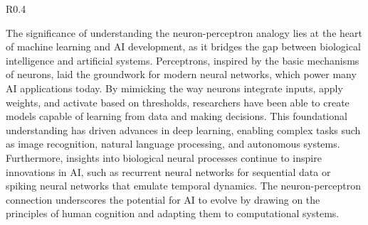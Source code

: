 \begin{wrapfigure}{R}{0.4\textwidth}
\begin{tcolorbox}[every float=\centering, drop shadow, title=The Perceptron ,colback=WMgold,colframe=WMgreen,
  colbacktitle=WMgreen,]
  \label{fig:singlePerceptron}
 \end{tcolorbox}
 \end{wrapfigure}
 

The significance of understanding the neuron-perceptron analogy lies at the heart of machine learning and AI development, as it bridges the gap between biological intelligence and artificial systems. Perceptrons, inspired by the basic mechanisms of neurons, laid the groundwork for modern neural networks, which power many AI applications today. By mimicking the way neurons integrate inputs, apply weights, and activate based on thresholds, researchers have been able to create models capable of learning from data and making decisions. This foundational understanding has driven advances in deep learning, enabling complex tasks such as image recognition, natural language processing, and autonomous systems. Furthermore, insights into biological neural processes continue to inspire innovations in AI, such as recurrent neural networks for sequential data or spiking neural networks that emulate temporal dynamics. The neuron-perceptron connection underscores the potential for AI to evolve by drawing on the principles of human cognition and adapting them to computational systems.

